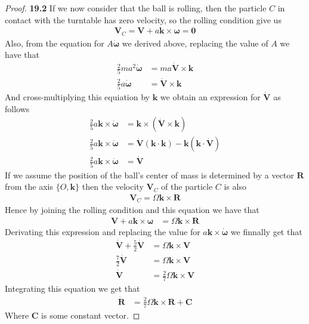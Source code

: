 \documentclass[11pt]{article}
\newcommand{\uvk}{\bm{k}}
\theoremstyle{definition}
\begin{document}
\begin{proof}{\textbf{19.2}}
    If we now consider that the ball is rolling, then the particle $C$ in
    contact with the turntable has zero velocity, so the rolling condition give
    us
    \begin{align*}
        \bm{V}_C = \bm{V} + a\uvk \times \bm{\omega} = \bm{0}
    \end{align*}
    Also, from the equation for $A \bm{\dot\omega}$ we derived above, replacing
    the value of $A$ we have that
    \begin{align*}
        \frac{2}{5}ma^2\bm{\dot{\omega}}
        &= ma\bm{\dot{V}}\times\bm{k}\\
        \frac{2}{5}a\bm{\dot{\omega}}
        &= \bm{\dot{V}}\times\bm{k}
    \end{align*}
    And cross-multiplying this equiation by $\uvk$ we obtain an expression for
    $\bm{\dot V}$ as follows
    \begin{align*}
        \frac{2}{5}a\uvk \times \bm{\dot{\omega}}
        &= \uvk \times(\bm{\dot{V}}\times\bm{k})\\
        \frac{2}{5}a\uvk \times \bm{\dot{\omega}}
        &= \bm{\dot{V}} (\uvk\cdot\uvk) - \uvk(\uvk\cdot\bm{\dot{V}})\\
        \frac{2}{5}a\uvk \times \bm{\dot{\omega}}
        &= \bm{\dot{V}}
    \end{align*}
    If we assume the position of the ball's center of mass is determined by a
    vector $\bm{R}$ from the axis $\{O, \uvk\}$ then the velocity $\bm V_C$
    of the particle $C$ is also
    \begin{align*}
        \bm{V}_C = \Omega\uvk \times \bm{R}
    \end{align*}
    Hence by joining the rolling condition and this equation we have that
    \begin{align*}
        \bm{V} + a\uvk \times \bm{\omega} &= \Omega\uvk \times \bm{R}
    \end{align*}
    Derivating this expression and replacing the value for
    $a\uvk \times \bm{\dot\omega}$ we finnally get that
    \begin{align*}
        \bm{\dot V} + \frac{5}{2}\bm{\dot V} &= \Omega\uvk \times \bm{V}\\
        \frac{7}{2}\bm{\dot V} &= \Omega\uvk \times \bm{V}\\
        \bm{\dot V} &= \frac{2}{7}\Omega\uvk \times \bm{V}
    \end{align*}
    Integrating this equation we get that
    \begin{align*}
        \bm{\dot R} &= \frac{2}{7}\Omega\uvk \times \bm{R} + \bm{C}
    \end{align*}
    Where $\bm{C}$ is some constant vector.


\end{proof}
\end{document}
